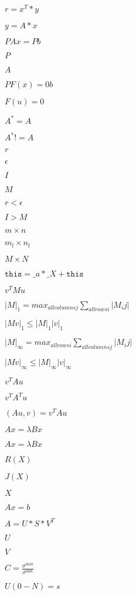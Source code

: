 \documentclass{article}
\begin{document}
$ r = x^T * y $
\pagebreak

$ y = A * x $
\pagebreak

$P A x = P b$
\pagebreak

$P$
\pagebreak

$A$
\pagebreak

$P F(x)=0 b$
\pagebreak

$F( u ) = 0$
\pagebreak

$A^* = A$
\pagebreak

$A^* != A$
\pagebreak

$r$
\pagebreak

$\epsilon$
\pagebreak

$I$
\pagebreak

$M$
\pagebreak

$ r < \epsilon $
\pagebreak

$ I > M $
\pagebreak

$ m \times n $
\pagebreak

$ m_l \times n_l $
\pagebreak

$ M \times N $
\pagebreak

$\texttt{this} = \_a*\_X + \texttt{this} $
\pagebreak

$ v^T M u $
\pagebreak

$|M|_1=max_{all columns j}\sum_{all rows i} |M_ij|$
\pagebreak

$|Mv|_1\leq |M|_1 |v|_1$
\pagebreak

$|M|_\infty=max_{all rows i}\sum_{all columns j} |M_ij|$
\pagebreak

$|Mv|_\infty \leq |M|_\infty |v|_\infty$
\pagebreak

$v^T A u$
\pagebreak

$v^T A^T u$
\pagebreak

$(Au, v)= v^T A u$
\pagebreak

$A x =\lambda B x$
\pagebreak

$A x = \lambda Bx$
\pagebreak

$ R(X) $
\pagebreak

$ J(X) $
\pagebreak

$ X $
\pagebreak

$ A x = b $
\pagebreak

$ A = U * S * V^T $
\pagebreak

$ U$
\pagebreak

$ V$
\pagebreak

$ C = \frac{\sigma^\mathrm{max}}{\sigma^\mathrm{min}} $
\pagebreak

$U(0-N) = s$
\pagebreak
\end{document}
